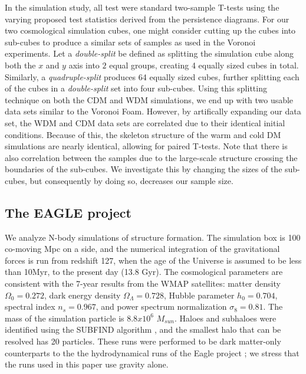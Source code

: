 \documentclass[12pt]{article}
\begin{document}
In the simulation study, all test were standard two-sample T-tests  using the varying proposed test statistics derived from the persistence diagrams.  For our two cosmological simulation cubes, one might consider cutting up the cubes into sub-cubes to produce a similar sets of samples as used in the Voronoi experiments. Let a \textit{double-split} be defined as splitting the simulation cube along both the $x$ and $y$ axis into $2$ equal groups, creating 4 equally sized cubes in total. Similarly, a \textit{quadruple-split} produces 64 equally sized cubes, further splitting each of the cubes in a \textit{double-split} set into four sub-cubes. Using this splitting technique on both the CDM and WDM simulations, we end up with two usable data sets similar to the Voronoi Foam. However, by artifically expanding our data set, the WDM and CDM data sets are correlated due to their identical initial conditions. Because of this, the skeleton structure of the warm and cold DM simulations are nearly identical, allowing for paired T-tests.  Note that there is also correlation between the samples due to the large-scale structure crossing the boundaries of the sub-cubes.  We investigate this by changing the sizes of the sub-cubes, but consequently by doing so, decreases our sample size.

\subsection{The EAGLE project}
We analyze N-body simulations of structure formation. The simulation box is 100 co-moving Mpc on a side, and the numerical integration of the gravitational forces is run from redshift 127, when the age of the Universe is assumed to be less than 10Myr, to the present day (13.8 Gyr). The cosmological parameters are consistent with the 7-year results from the WMAP satellites: matter density $\Omega_0 = 0.272$, dark energy density $\Omega_{\Lambda} = 0.728$, Hubble parameter $h_0 = 0.704$, spectral index $n_s=0.967$, and power spectrum normalization $\sigma_8=0.81$. The mass of the simulation particle is $8.8x10^6$ $M_{sun}$. Haloes and subhaloes were identified using the SUBFIND algorithm \citep{springel2001populating}, and the smallest halo that can be resolved has 20 particles. These runs were performed to be dark matter-only counterparts to the the hydrodynamical runs of the Eagle project \citep{schaye2015eagle}; we stress that the runs used in this paper use gravity alone.
\end{document}
